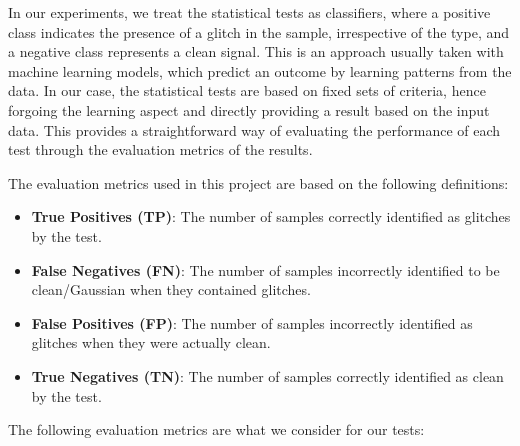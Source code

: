 \documentclass[12pt]{article}
\begin{document}
In our experiments, we treat the statistical tests as classifiers, where a positive class indicates the presence of a glitch in the sample, irrespective of the type, and a negative class represents a clean signal. This is an approach usually taken with machine learning models, which predict an outcome by learning patterns from the data. In our case, the statistical tests are based on fixed sets of criteria, hence forgoing the learning aspect and directly providing a result based on the input data. This provides a straightforward way of evaluating the performance of each test through the evaluation metrics of the results.

\medskip
\noindent The evaluation metrics used in this project are based on the following definitions:

\begin{itemize}
  \item \textbf{True Positives (TP)}: The number of samples correctly identified as glitches by the test.
  \item \textbf{False Negatives (FN)}: The number of samples incorrectly identified to be clean/Gaussian when they contained glitches.
  \item \textbf{False Positives (FP)}: The number of samples incorrectly identified as glitches when they were actually clean.
  \item \textbf{True Negatives (TN)}: The number of samples correctly identified as clean by the test.
\end{itemize}

\noindent The following evaluation metrics are what we consider for our tests:
\end{document}
